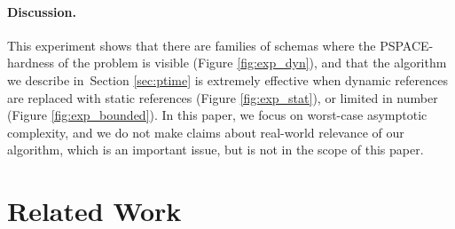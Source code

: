 \paragraph{Discussion.}%
This experiment shows that there are families of schemas where the PSPACE-hardness of the problem is
visible (Figure \ref{fig:exp_dyn}), and that the algorithm we describe in~Section \ref{sec:ptime} is extremely effective when 
dynamic references are replaced with static references (Figure \ref{fig:exp_stat}), or limited in number (Figure \ref{fig:exp_bounded}).
In this paper, we focus on worst-case asymptotic complexity, and we do not make claims
about real-world relevance of our algorithm, which is an important issue, but is not in the scope of this paper.



\section{Related Work}\label{sec:relwork}



%
%


